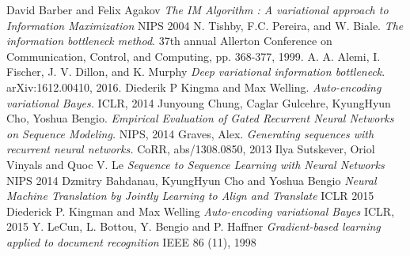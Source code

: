 \documentclass[10pt,oneside,openright]{report}
\begin{document}
\begin{thebibliography}{9} 
David Barber and Felix Agakov
\textit{The IM Algorithm : A variational approach to Information Maximization}
NIPS 2004
N. Tishby, F.C. Pereira, and W. Biale.
\textit{The information bottleneck method}.
37th annual Allerton Conference on Communication, Control, and Computing, pp. 368-377, 1999.
A. A. Alemi, I. Fischer, J. V. Dillon, and K. Murphy
\textit{Deep variational information bottleneck}.
 arXiv:1612.00410, 2016.
 Diederik P Kingma and Max Welling.
 \textit{Auto-encoding variational Bayes.}
  ICLR, 2014
 Junyoung Chung, Caglar Gulcehre, KyungHyun Cho, Yoshua Bengio.
 \textit{Empirical Evaluation of Gated Recurrent Neural Networks on Sequence Modeling.}
  NIPS, 2014
 Graves, Alex.
 \textit{Generating sequences with recurrent neural networks.}
 CoRR, abs/1308.0850, 2013
Ilya Sutskever, Oriol Vinyals and Quoc V. Le
\textit{Sequence to Sequence Learning with Neural Networks}
NIPS 2014
Dzmitry Bahdanau, KyungHyun Cho and Yoshua Bengio
\textit{Neural Machine Translation by Jointly Learning to Align and Translate}
ICLR 2015
Diederick P. Kingman and Max Welling
\textit{Auto-encoding variational Bayes}
ICLR, 2015
Y. LeCun, L. Bottou, Y. Bengio and P. Haffner
\textit{Gradient-based learning applied to document recognition}
IEEE 86 (11), 1998
\end{thebibliography}
\end{document}
